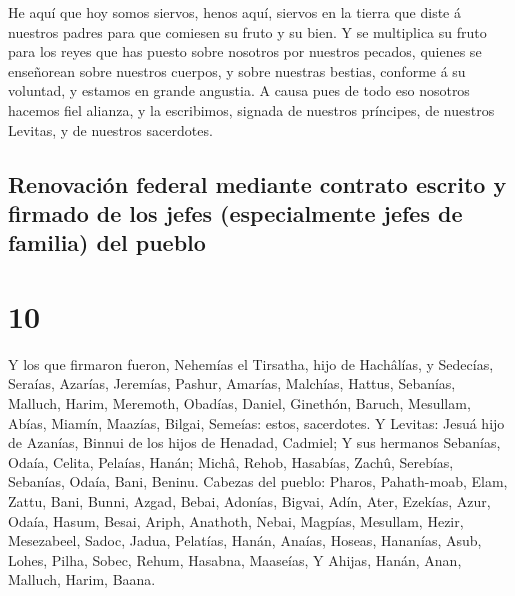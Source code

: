  He aquí que hoy somos siervos, henos aquí, siervos en la
tierra que diste á nuestros padres para que comiesen su fruto y su bien.
 Y se multiplica su fruto para los reyes que has puesto
sobre nosotros por nuestros pecados, quienes se enseñorean sobre
nuestros cuerpos, y sobre nuestras bestias, conforme á su voluntad, y
estamos en grande angustia.  A causa pues de todo eso
nosotros hacemos fiel alianza, y la escribimos, signada de nuestros
príncipes, de nuestros Levitas, y de nuestros sacerdotes.

\hypertarget{renovaciuxf3n-federal-mediante-contrato-escrito-y-firmado-de-los-jefes-especialmente-jefes-de-familia-del-pueblo}{%
\subsection{Renovación federal mediante contrato escrito y firmado de
los jefes (especialmente jefes de familia) del
pueblo}\label{renovaciuxf3n-federal-mediante-contrato-escrito-y-firmado-de-los-jefes-especialmente-jefes-de-familia-del-pueblo}}

\hypertarget{section-9}{%
\section{10}\label{section-9}}

 Y los que firmaron fueron, Nehemías el Tirsatha, hijo de
Hachâlías, y Sedecías,  Seraías, Azarías, Jeremías,
 Pashur, Amarías, Malchías,  Hattus, Sebanías,
Malluch,  Harim, Meremoth, Obadías,  Daniel,
Ginethón, Baruch,  Mesullam, Abías, Miamín, 
Maazías, Bilgai, Semeías: estos, sacerdotes.  Y Levitas:
Jesuá hijo de Azanías, Binnui de los hijos de Henadad, Cadmiel;
 Y sus hermanos Sebanías, Odaía, Celita, Pelaías, Hanán;
 Michâ, Rehob, Hasabías,  Zachû, Serebías,
Sebanías,  Odaía, Bani, Beninu.  Cabezas del
pueblo: Pharos, Pahath-moab, Elam, Zattu, Bani,  Bunni,
Azgad, Bebai,  Adonías, Bigvai, Adín,  Ater,
Ezekías, Azur,  Odaía, Hasum, Besai,  Ariph,
Anathoth, Nebai,  Magpías, Mesullam, Hezir, 
Mesezabeel, Sadoc, Jadua,  Pelatías, Hanán, Anaías,
 Hoseas, Hananías, Asub,  Lohes, Pilha, Sobec,
 Rehum, Hasabna, Maaseías,  Y Ahijas, Hanán,
Anan,  Malluch, Harim, Baana.


